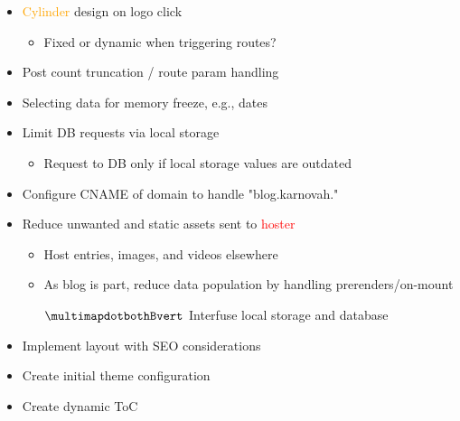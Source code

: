 \documentclass[7px]{article}
\begin{document}
{
  \raggedright
  \begin{itemize}[label=\blitzb]
    \small
    \item \textcolor{orange}{Cylinder} design on logo click\:
      \begin{itemize}[label=$\multimapinv$]
        \item Fixed or dynamic when triggering routes?
      \end{itemize}
      \normalsize
    \item Post count truncation / route param handling
    \item Selecting data for memory freeze, e.g., dates
    \item Limit DB requests via local storage
      \small
      \begin{itemize}[label=$\multimapinv$]
        \item Request to DB only if local storage values are outdated
      \end{itemize}
      \normalsize
    \item Configure CNAME of domain to handle "blog.karnovah.\textasteriskcentered"
    \item Reduce unwanted and static assets sent to \textcolor{red}{hoster}
      \small
      \begin{itemize}[label=$\multimapinv$]
        \item Host entries, images, and videos elsewhere
        \item As blog is part, reduce data population by handling prerenders/on-mount
        \item[$\multimapdotbothBvert$] Interfuse local storage and database 
      \end{itemize}
      \normalsize
  \end{itemize}
}

\deploy
{
  \begin{itemize}
    \item Implement layout with SEO considerations
    \item Create initial theme configuration
    \item Create dynamic ToC
  \end{itemize}
}
{

}

\report
{

}
\end{document}
